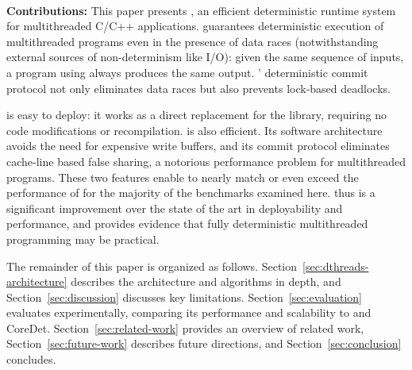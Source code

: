 \hspace{1em} \\
\noindent
\textbf{Contributions:}
This paper presents \textbf{\dthreads{}}, an efficient deterministic runtime
system for multithreaded C/C++ applications. \dthreads{} guarantees
deterministic execution of multithreaded programs even in the presence
of data races (notwithstanding external sources of non-determinism
like I/O): given the same sequence of inputs, a program
using \dthreads{} always produces the same output. \dthreads{}'
deterministic commit protocol not only eliminates data races but also
prevents lock-based deadlocks.

\dthreads{} is easy to deploy: it works as a direct replacement for
the \pthreads{} library, requiring no code modifications or
recompilation. \dthreads{} is also efficient. Its software
architecture avoids the need for expensive write buffers, and 
its commit protocol eliminates cache-line based false sharing, a
notorious performance problem for multithreaded programs. These two
features enable \dthreads{} to nearly match or even exceed the
performance of \pthreads{} for the majority of the benchmarks examined
here. \dthreads{}
thus is a significant improvement over the state of the art in
deployability and performance, and provides evidence that fully
deterministic multithreaded programming may be practical.





The remainder of this paper is organized as
follows. Section~\ref{sec:dthreads-architecture} describes
the \dthreads{} architecture and algorithms in depth, and
Section~\ref{sec:discussion} discusses key
limitations. Section~\ref{sec:evaluation} evaluates \dthreads{}
experimentally, comparing its performance and scalability
to \pthreads{} and CoreDet. Section~\ref{sec:related-work} provides an
overview of related work, Section~\ref{sec:future-work} describes
future directions, and Section~\ref{sec:conclusion} concludes.
